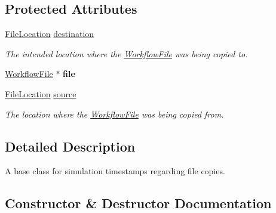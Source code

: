 \subsection*{Protected Attributes}
\begin{DoxyCompactItemize}
\item 
\mbox{\label{classwrench_1_1_simulation_timestamp_file_copy_af59ccf507af27b084a0618f3160efae1}} 
\hyperlink{structwrench_1_1_simulation_timestamp_file_copy_1_1_file_location}{File\+Location} \hyperlink{classwrench_1_1_simulation_timestamp_file_copy_af59ccf507af27b084a0618f3160efae1}{destination}
\begin{DoxyCompactList}\small\item\em The intended location where the \hyperlink{classwrench_1_1_workflow_file}{Workflow\+File} was being copied to. \end{DoxyCompactList}\item 
\mbox{\label{classwrench_1_1_simulation_timestamp_file_copy_aaf6fab52084bae83e672a8247acdf118}} 
\hyperlink{classwrench_1_1_workflow_file}{Workflow\+File} $\ast$ {\bfseries file}
\item 
\mbox{\label{classwrench_1_1_simulation_timestamp_file_copy_a62eeb6d5cc2e7103cc7b42478da660c7}} 
\hyperlink{structwrench_1_1_simulation_timestamp_file_copy_1_1_file_location}{File\+Location} \hyperlink{classwrench_1_1_simulation_timestamp_file_copy_a62eeb6d5cc2e7103cc7b42478da660c7}{source}
\begin{DoxyCompactList}\small\item\em The location where the \hyperlink{classwrench_1_1_workflow_file}{Workflow\+File} was being copied from. \end{DoxyCompactList}\end{DoxyCompactItemize}


\subsection{Detailed Description}
A base class for simulation timestamps regarding file copies. 

\subsection{Constructor \& Destructor Documentation}
\mbox{\label{classwrench_1_1_simulation_timestamp_file_copy_a76fca039f3cf0f76768d13c437af2a14}} 
